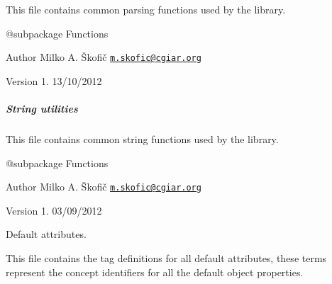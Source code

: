 This file contains common parsing functions used by the library.

\begin{DoxyVerb} @subpackage        Functions
\end{DoxyVerb}


\begin{DoxyAuthor}{Author}
Milko A. Škofič \href{mailto:m.skofic@cgiar.org}{\tt m.\-skofic@cgiar.\-org} 
\end{DoxyAuthor}
\begin{DoxyVersion}{Version}
1. 13/10/2012
\end{DoxyVersion}
\subparagraph*{String utilities}

This file contains common string functions used by the library.

\begin{DoxyVerb} @subpackage        Functions
\end{DoxyVerb}


\begin{DoxyAuthor}{Author}
Milko A. Škofič \href{mailto:m.skofic@cgiar.org}{\tt m.\-skofic@cgiar.\-org} 
\end{DoxyAuthor}
\begin{DoxyVersion}{Version}
1. 03/09/2012
\end{DoxyVersion}
Default attributes.

This file contains the tag definitions for all default attributes, these terms represent the concept identifiers for all the default object properties.


